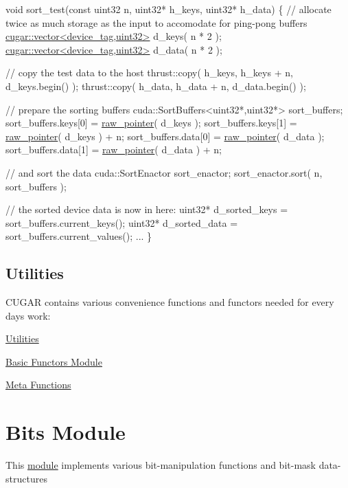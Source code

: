\begin{DoxyCode}
\textcolor{keywordtype}{void} sort\_test(\textcolor{keyword}{const} uint32 n, uint32* h\_keys, uint32* h\_data)
\{
    \textcolor{comment}{// allocate twice as much storage as the input to accomodate for ping-pong buffers}
    \hyperlink{structcugar_1_1vector}{cugar::vector<device\_tag,uint32>} d\_keys( n * 2 );
    \hyperlink{structcugar_1_1vector}{cugar::vector<device\_tag,uint32>} d\_data( n * 2 );

    \textcolor{comment}{// copy the test data to the host}
    thrust::copy( h\_keys, h\_keys + n, d\_keys.begin() );
    thrust::copy( h\_data, h\_data + n, d\_data.begin() );

    \textcolor{comment}{// prepare the sorting buffers}
    cuda::SortBuffers<uint32*,uint32*> sort\_buffers;
    sort\_buffers.keys[0] = \hyperlink{namespacecugar_a3f6cb2c817f2ba065931cec569aa848b}{raw\_pointer}( d\_keys );
    sort\_buffers.keys[1] = \hyperlink{namespacecugar_a3f6cb2c817f2ba065931cec569aa848b}{raw\_pointer}( d\_keys ) + n;
    sort\_buffers.data[0] = \hyperlink{namespacecugar_a3f6cb2c817f2ba065931cec569aa848b}{raw\_pointer}( d\_data );
    sort\_buffers.data[1] = \hyperlink{namespacecugar_a3f6cb2c817f2ba065931cec569aa848b}{raw\_pointer}( d\_data ) + n;

    \textcolor{comment}{// and sort the data}
    cuda::SortEnactor sort\_enactor;
    sort\_enactor.sort( n, sort\_buffers );

    \textcolor{comment}{// the sorted device data is now in here:}
    uint32* d\_sorted\_keys = sort\_buffers.current\_keys();
    uint32* d\_sorted\_data = sort\_buffers.current\_values();
    ...
\}
\end{DoxyCode}
 \hypertarget{utilities_page}{}\subsection{Utilities}\label{utilities_page}
C\+U\+G\+AR contains various convenience functions and functors needed for every day\textquotesingle{}s work\+:


\begin{DoxyItemize}
\item \hyperlink{group___basic_utils}{Utilities}
\item \hyperlink{group___basic_functors}{Basic Functors Module}
\item \hyperlink{group___basic_meta_functions}{Meta Functions} 
\end{DoxyItemize}\hypertarget{bits_page}{}\section{Bits Module}\label{bits_page}
This \hyperlink{group___bits_module}{module} implements various bit-\/manipulation functions and bit-\/mask data-\/structures


